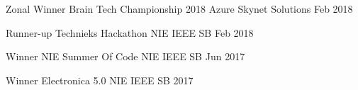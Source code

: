 


\begin{cvhonors}
  \cvhonor
    {Zonal Winner} %
    {Brain Tech Championship 2018} %
    {Azure Skynet Solutions} %
    {Feb 2018} %


  \cvhonor
    {Runner-up} %
    {Technieks Hackathon} %
    {NIE IEEE SB} %
    {Feb 2018} %

  \cvhonor
    { Winner} %
    {NIE Summer Of Code} %
    {NIE IEEE SB} %
    {Jun 2017} %

  \cvhonor
    {Winner} %
    {Electronica 5.0} %
    {NIE IEEE SB} %
    {2017} %

\end{cvhonors}




